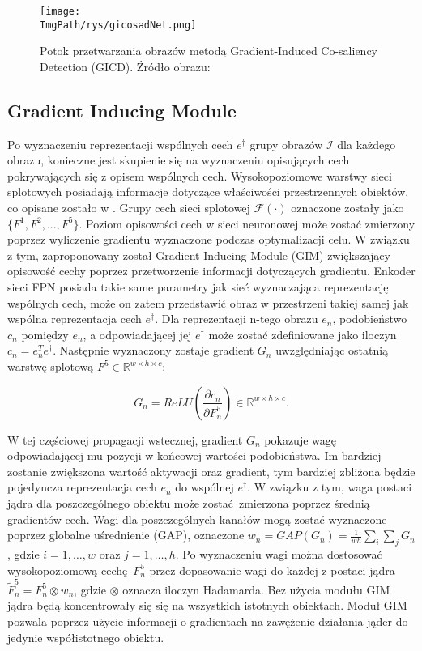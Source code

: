 \documentclass[a4paper,12pt,twoside,openany]{report}
\newcommand{\ImgPath}{.}
\begin{document}
\begin{figure}[h]
	\centering
	\texttt{[image: \\ImgPath/rys/gicosadNet.png]}
	\caption{Potok przetwarzania obrazów metodą Gradient-Induced Co-saliency Detection (GICD). Źródło obrazu: \cite{zhang2020gradientinduced}}
	\label{GICDnet}
\end{figure}

\subsection{Gradient Inducing Module}
Po wyznaczeniu reprezentacji wspólnych cech $e^\dagger$ grupy obrazów $\mathcal{I}$ dla każdego obrazu, konieczne jest skupienie się na wyznaczeniu opisujących cech pokrywających się z opisem wspólnych cech. Wysokopoziomowe warstwy sieci splotowych posiadają informacje dotyczące właściwości przestrzennych obiektów, co opisane zostało w \cite{Selvaraju_2019}. Grupy cech sieci splotowej $\mathcal{F}(\cdot)$ oznaczone zostały jako $\{F^1, F^2, ..., F^5\}$. Poziom opisowości cech w sieci neuronowej może zostać zmierzony poprzez wyliczenie gradientu wyznaczone podczas optymalizacji celu. W związku z tym, zaproponowany został Gradient Inducing Module (GIM) zwiększający opisowość cechy poprzez przetworzenie informacji dotyczących gradientu. Enkoder sieci FPN posiada takie same parametry jak sieć wyznaczająca reprezentację wspólnych cech, może on zatem przedstawić obraz w przestrzeni takiej samej jak wspólna reprezentacja cech $e^\dagger$. Dla reprezentacji n-tego obrazu $e_n$, podobieństwo $c_n$ pomiędzy $e_n$, a odpowiadającej jej $e^\dagger$ może zostać zdefiniowane jako iloczyn $c_n = e_n^Te^\dagger$. Następnie wyznaczony zostaje gradient $G_n$ uwzględniając ostatnią warstwę splotową $F^5\in\mathds{R}^{w\times h\times c}$:

\begin{equation}
 G_n = ReLU \left(\frac{\partial c_n}{\partial F^5_n}\right) \in \mathds{R}^{w\times h\times c}.
\end{equation}

W tej częściowej propagacji wstecznej, gradient $G_n$ pokazuje wagę odpowiadającej mu pozycji w końcowej wartości podobieństwa. Im bardziej zostanie zwiększona wartość aktywacji oraz gradient, tym bardziej zbliżona będzie pojedyncza reprezentacja cech $e_n$ do wspólnej $e^\dagger$. W związku z tym, waga postaci jądra dla poszczególnego obiektu może zostać zmierzona poprzez średnią gradientów cech. Wagi dla poszczególnych kanałów mogą zostać wyznaczone poprzez globalne uśrednienie (GAP), oznaczone $w_n = GAP(G_n) = \frac{1}{wh}\sum_i\sum_jG_n$, gdzie $i = 1, \dots, w$ oraz $j = 1, \dots, h$.  Po wyznaczeniu wagi można dostosować wysokopoziomową cechę $F_n^5$ przez dopasowanie wagi do każdej z postaci jądra $\tilde F_n^5 = F_n^5 \otimes w_n$, gdzie $\otimes$ oznacza iloczyn Hadamarda. Bez użycia modułu GIM jądra będą koncentrowały się się na wszystkich istotnych obiektach. Moduł GIM pozwala poprzez użycie informacji o gradientach na zawężenie działania jąder do jedynie współistotnego obiektu.
\end{document}
